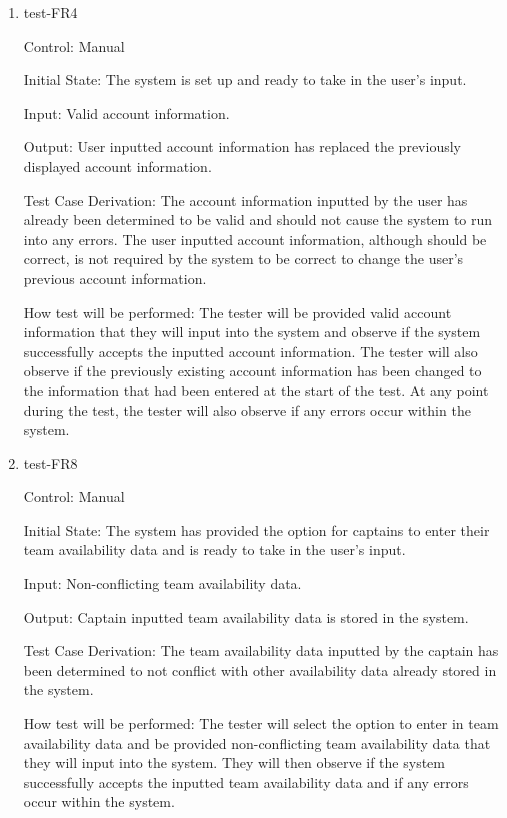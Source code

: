\documentclass[12pt, titlepage]{article}
\begin{document}
\begin{enumerate}

\item{test-FR4\\}

Control: Manual
					
Initial State: The system is set up and ready to take in the user's input.
					
Input: Valid account information.
					
Output: User inputted account information has replaced the previously displayed
account information.

Test Case Derivation: The account information inputted by the user has already been
determined to be valid and should not cause the system to run into any errors. The
user inputted account information, although should be correct, is not required by
the system to be correct to change the user's previous account information.
					
How test will be performed: The tester will be provided valid account information
that they will input into the system and observe if the system successfully
accepts the inputted account information. The tester will also observe if the previously
existing account information has been changed to the information that had been entered
at the start of the test. At any point during the test, the tester will also observe if
any errors occur within the system. 

\item{test-FR8\\}

Control: Manual
					
Initial State: The system has provided the option for captains to enter their team
availability data and is ready to take in the user's input.
					
Input: Non-conflicting team availability data.
					
Output: Captain inputted team availability data is stored in the system.

Test Case Derivation: The team availability data inputted by the captain has been
determined to not conflict with other availability data already stored in the system.
					
How test will be performed: The tester will select the option to enter in team 
availability data and be provided non-conflicting team availability
data that they will input into the system. They will then observe if the system successfully
accepts the inputted team availability data and if any errors occur within the system. 
					

\end{enumerate}
\end{document}
